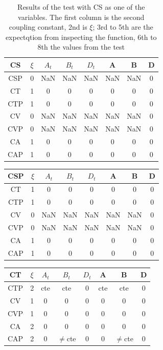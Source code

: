 \documentclass[twocolumn]{article}
\begin{document}
\begin{table}[H]
	\begin{tabular}{|c|c|c|c|c|c|c|c|}
		\hline
		CS & $\xi $& $A_t$ & $B_t$ & $D_t$ & A & B & D \\
		\hline
		CSP & 0 & NaN & NaN & NaN & NaN & NaN & 0\\
		\hline
		CT & 1 & 0 & 0 & 0 & 0 & 0 & 0\\
		\hline
		CTP & 1 & 0 & 0 & 0 & 0 & 0 & 0\\
		\hline
		CV & 0 & NaN & NaN & NaN & NaN & NaN & 0\\
		\hline
		CVP & 0 & NaN & NaN & NaN & NaN & NaN & 0\\
		\hline
		CA & 1 & 0 & 0 & 0 & 0 & 0 & 0\\
		\hline
		CAP & 1 & 0 & 0 & 0 & 0 & 0 & 0\\
		\hline
	\end{tabular}
	\caption{Results of the test with CS as one of the variables. The first column is the second coupling constant, 2nd is $\xi$; 3rd to 5th are the expectqtion from inspecting the function, 6th to 8th the values from the test}
\end{table}

\begin{table}[H]
	\begin{tabular}{|c|c|c|c|c|c|c|c|}
		\hline
		CSP & $\xi $& $A_t$ & $B_t$ & $D_t$ & A & B & D \\
		\hline
		CT & 1 & 0 & 0 & 0 & 0 & 0 & 0\\
		\hline
		CTP & 1 & 0 & 0 & 0 & 0 & 0 & 0\\
		\hline
		CV & 0 & NaN & NaN & NaN & NaN & NaN & 0\\
		\hline
		CVP & 0 & NaN & NaN & NaN & NaN & NaN & 0\\
		\hline
		CA & 1 & 0 & 0 & 0 & 0 & 0 & 0\\
		\hline
		CAP & 1 & 0 & 0 & 0 & 0 & 0 & 0\\
		\hline
	\end{tabular}
\end{table}

\begin{table}[H]
	\begin{tabular}{|c|c|c|c|c|c|c|c|}
		\hline
		CT & $\xi $& $A_t$ & $B_t$ & $D_t$ & A & B & D \\
		\hline
		CTP & 2 & cte & cte & 0 & cte & cte & 0\\
		\hline
		CV & 1 & 0 & 0 & 0 & 0 & 0 & 0\\
		\hline
		CVP & 1 & 0 & 0 & 0 & 0 & 0 & 0\\
		\hline
		CA & 2 & 0 & 0 & 0 & 0 & 0 & 0\\
		\hline
		CAP & 2 & 0 & $\neq$cte & 0 & 0 & $\neq$cte & 0\\
		\hline
	\end{tabular}
\end{table}
\end{document}

